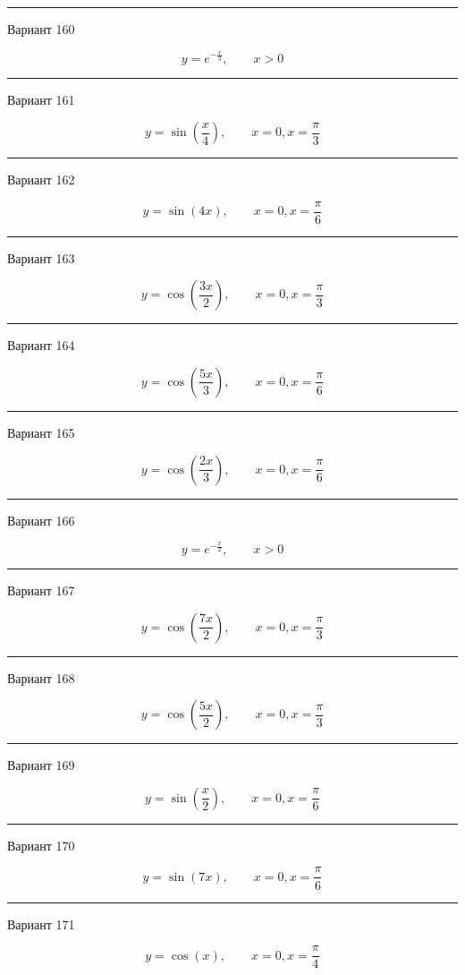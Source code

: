 \documentclass[11pt]{report}
\begin{document}
\rule{\textwidth}{.2mm}

Вариант 160

$$y=e^{- \frac{x}{3}}, \qquad x > 0$$

\rule{\textwidth}{.2mm}

Вариант 161

$$y=\sin{\left(\frac{x}{4} \right)}, \qquad x = 0, x = \frac{\pi}{3}$$

\rule{\textwidth}{.2mm}

Вариант 162

$$y=\sin{\left(4 x \right)}, \qquad x = 0, x = \frac{\pi}{6}$$

\rule{\textwidth}{.2mm}

Вариант 163

$$y=\cos{\left(\frac{3 x}{2} \right)}, \qquad x = 0, x = \frac{\pi}{3}$$

\rule{\textwidth}{.2mm}

Вариант 164

$$y=\cos{\left(\frac{5 x}{3} \right)}, \qquad x = 0, x = \frac{\pi}{6}$$

\rule{\textwidth}{.2mm}

Вариант 165

$$y=\cos{\left(\frac{2 x}{3} \right)}, \qquad x = 0, x = \frac{\pi}{6}$$

\rule{\textwidth}{.2mm}

Вариант 166

$$y=e^{- \frac{x}{2}}, \qquad x > 0$$

\rule{\textwidth}{.2mm}

Вариант 167

$$y=\cos{\left(\frac{7 x}{2} \right)}, \qquad x = 0, x = \frac{\pi}{3}$$

\rule{\textwidth}{.2mm}

Вариант 168

$$y=\cos{\left(\frac{5 x}{2} \right)}, \qquad x = 0, x = \frac{\pi}{3}$$

\rule{\textwidth}{.2mm}

Вариант 169

$$y=\sin{\left(\frac{x}{2} \right)}, \qquad x = 0, x = \frac{\pi}{6}$$

\rule{\textwidth}{.2mm}

Вариант 170

$$y=\sin{\left(7 x \right)}, \qquad x = 0, x = \frac{\pi}{6}$$

\rule{\textwidth}{.2mm}

Вариант 171

$$y=\cos{\left(x \right)}, \qquad x = 0, x = \frac{\pi}{4}$$
\end{document}
